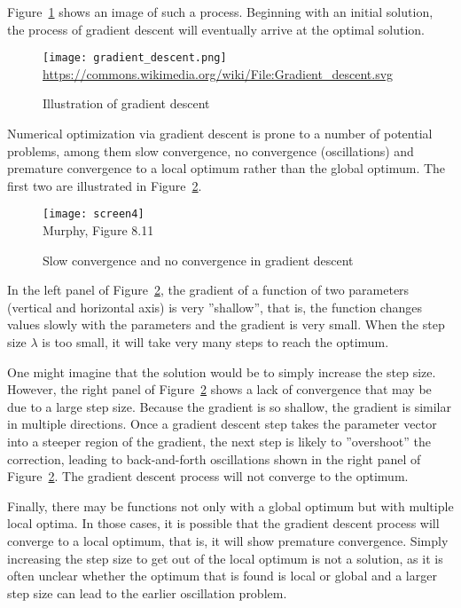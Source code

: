 Figure~\ref{fig:gradientdescent} shows an image of such a process. Beginning with an initial solution, the process of gradient descent will eventually arrive at the optimal solution.

\begin{figure}
\centering
\texttt{[image: gradient\_descent.png]} \\

\scriptsize \url{https://commons.wikimedia.org/wiki/File:Gradient_descent.svg}
\caption{Illustration of gradient descent}
\label{fig:gradientdescent}
\end{figure}

Numerical optimization via gradient descent is prone to a number of potential problems, among them slow convergence, no convergence (oscillations) and premature convergence to a local optimum rather than the global optimum. The first two are illustrated in Figure~\ref{fig:screen4_chap15}.

\begin{figure}
\centering
\texttt{[image: screen4]} \\

\scriptsize Murphy, Figure 8.11
\caption{Slow convergence and no convergence in gradient descent}
\label{fig:screen4_chap15}
\end{figure}

In the left panel of Figure~\ref{fig:screen4_chap15}, the gradient of a function of two parameters (vertical and horizontal axis) is very ''shallow'', that is, the function changes values slowly with the parameters and the gradient is very small. When the step size $\lambda$ is too small, it will take very many steps to reach the optimum. 

One might imagine that the solution would be to simply increase the step size. However, the right panel of Figure~\ref{fig:screen4_chap15} shows a lack of convergence that may be due to a large step size. Because the gradient is so shallow, the gradient is similar in multiple directions. Once a gradient descent step takes the parameter vector into a steeper region of the gradient, the next step is likely to ''overshoot'' the correction, leading to back-and-forth oscillations shown in the right panel of Figure~\ref{fig:screen4_chap15}. The gradient descent process will not converge to the optimum. 

Finally, there may be functions not only with a global optimum but with multiple local optima. In those cases, it is possible that the gradient descent process will converge to a local optimum, that is, it will show premature convergence. Simply increasing the step size to get out of the local optimum is not a solution, as it is often unclear whether the optimum that is found is local or global and a larger step size can lead to the earlier oscillation problem.

